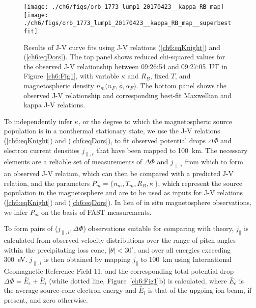 
  \begin{figure}
    \centering
    \noindent\texttt{[image: ./ch6/figs/orb\_1773\_lump1\_20170423\_\_kappa\_RB\_map]}
    \noindent\texttt{[image: ./ch6/figs/orb\_1773\_lump1\_20170423\_\_kappa\_RB\_map\_\_superbestfit]}
    \caption[Orbit 1773: Reduced chi-squared values for observed J-V
    curves with variable $\kappa$ and $R_B$, fixed $T$, and
    magnetospheric density $n_m \big ( n_F, \bar{\phi}, \alpha_F \big
    )$, and corresponding best-fit J-V curves.]{Results of J-V curve
      fits using J-V relations (\ref{ch6:eqKnight}) and
      (\ref{ch6:eqDors}). The top panel shows reduced chi-squared
      values for the observed J-V relationship between 09:26:54 and
      09:27:05~UT in Figure~\ref{ch6:Fig1}, with variable $\kappa$ and
      $R_B$, fixed $T$, and magnetospheric density $n_m \big ( n_F,
      \bar{\phi}, \alpha_F \big )$. The bottom panel shows the
      observed J-V relationship and corresponding best-fit Maxwellian and
      kappa J-V relations.}
    \label{ch6:Fig3}
  \end{figure}


  To independently infer $\kappa$, or the degree to which the
  magnetospheric source population is in a nonthermal stationary
  state, we use the J-V relations (\ref{ch6:eqKnight}) and
  (\ref{ch6:eqDors}), to fit observed potential drops $\Delta \Phi$
  and electron current densities $j_{\parallel,i}$ that have been
  mapped to 100~km. The necessary elements are a reliable set of
  measurements of $\Delta \Phi$ and $j_{\parallel,i}$ from which to
  form an observed J-V relation, which can then be compared with a
  predicted J-V relation, and the parameters $P_m = \{ n_m, T_m, R_B,
  \kappa \, \}$, which represent the source population in the
  magnetosphere and are to be used as inputs for J-V relations
  (\ref{ch6:eqKnight}) and (\ref{ch6:eqDors}). In lieu of in situ
  magnetosphere observations, we infer $P_m$ on the basis of FAST
  measurements.

  To form pairs of ($j_{\parallel,i}, \Delta \Phi$) observations
  suitable for comparing with theory, $j_\parallel$ is calculated from
  observed velocity distributions over the range of pitch angles
  within the precipitating loss cone, $\vert \theta \vert
  < 30^\circ$, and over all energies exceeding 300~eV.
  $j_{\parallel,i}$ is then obtained by mapping $j_\parallel$ to
  100~km using International Geomagnetic Reference Field 11, and the
  corresponding total potential drop $\Delta \Phi = \bar{E}_e +
  \bar{E}_i$ (white dotted line, Figure~\ref{ch6:Fig1}b) is
  calculated, where $\bar{E}_e$ is the average source-cone electron
  energy and $\bar{E}_i$ is that of the upgoing ion beam, if present,
  and zero otherwise.

